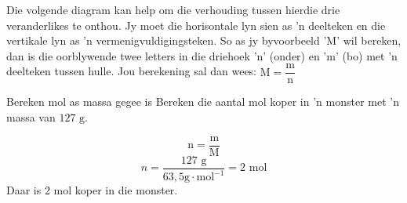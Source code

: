       \label{m38717*id277605}
Die volgende diagram kan help om die verhouding tussen hierdie drie veranderlikes te onthou. Jy moet die horisontale lyn sien as  'n deelteken en die vertikale lyn as  'n ver\-me\-nig\-vul\-dig\-ings\-te\-ken. So as jy byvoorbeeld 'M' wil bereken, dan is die oorblywende twee letters in  die driehoek 'n' (onder) en 'm' (bo) met 'n deelteken tussen hulle. Jou berekening sal dan wees:
 $\text{M}=\dfrac{\text{m}}{\text{n}}$
      \label{m38717*id277613}
    \setcounter{subfigure}{0}
	\begin{figure}[H] %
\begin{center}
\end{center}
 \end{figure}       
      \par 
\label{m38717*secfhsst!!!underscore!!!id409}
      \noindent
      \begin{wex}{Bereken mol as massa gegee is}{
\label{m38717*probfhsst!!!underscore!!!id410}
      \label{m38717*id277635}Bereken die aantal mol koper in 'n monster met 'n massa van $127 \text{ g}$. 
      }
{
      \label{m38717*id277680}\nopagebreak\noindent{}
        
    \begin{equation*}
    \text{n}=\frac{\text{m}}{\text{M}}
      \end{equation*}
      \label{m38717*id277705}\nopagebreak\noindent{}
    \begin{equation*}
    n=\frac{127 \text{ g}}{63,5 \text{g} \cdot \text{mol}^{-1}}=2 \text{ mol}
      \end{equation*}
      \label{m38717*id277735}Daar is 2 mol koper in die monster.
}
    \end{wex}
    
